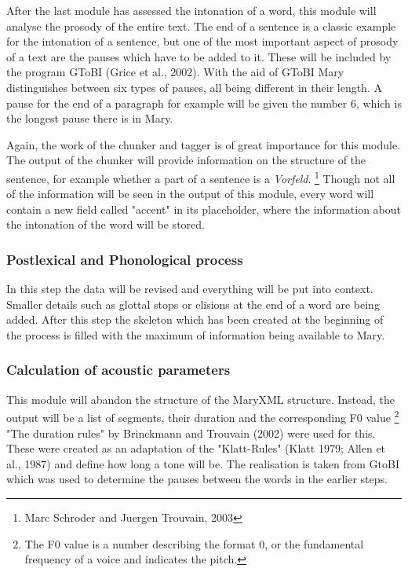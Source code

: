 \documentclass[a4paper, 12pt]{article}
\begin{document}
After the last module has assessed the intonation of a word, this module will analyse the prosody of the entire text.
The end of a sentence is a classic example for the intonation of a sentence, but one of the most important aspect of prosody of a text are the pauses which have to be added to it.
These will be included by the program GToBI (Grice et al., 2002). 
With the aid of GToBI Mary distinguishes between six types of pauses, all being different in their length.
A pause for the end of a paragraph for example will be given the number 6, which is the longest pause there is in Mary.

Again, the work of the chunker and tagger is of great importance for this module.
The output of the chunker will provide information on the structure of the sentence, for example whether a part of a sentence is a \emph{Vorfeld}. \footnote {Marc Schroder and Juergen Trouvain, 2003}
Though not all of the information will be seen in the output of this module, every word will contain a new field called "accent" in its placeholder, where the information about the intonation of the word will be stored.

\subsubsection*{Postlexical and Phonological process}

In this step the data will be revised and everything will be put into context.
Smaller details such as glottal stops or elisions at the end of a word are being added. 
After this step the skeleton which has been created at the beginning of the process is filled with the maximum of information being available to Mary.

\subsubsection*{Calculation of acoustic parameters} 

This module will abandon the structure of the MaryXML structure.
Instead, the output will be a list of segments, their duration and the corresponding F0 value \footnote {The F0 value is a number describing the format 0, or the fundamental frequency of a voice and indicates the pitch.}
"The duration rules" by Brinckmann and Trouvain (2002) were used for this. These were created as an adaptation of the  "Klatt-Rules" (Klatt 1979; Allen et al., 1987) and define how long a tone will be.
The realisation is taken from GtoBI which was used to determine the pauses between the words in the earlier steps.
\end{document}
